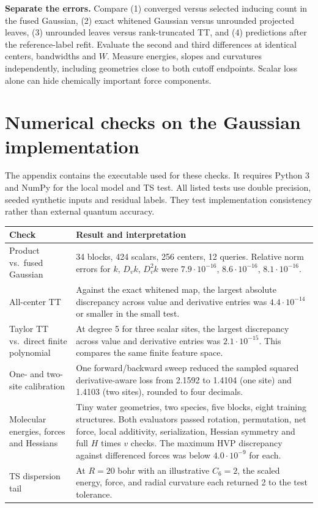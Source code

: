 \documentclass[11pt,a4paper]{article}
\begin{document}
\textbf{Separate the errors.} Compare (1) converged versus selected inducing count in the fused Gaussian, (2) exact whitened Gaussian versus unrounded projected leaves, (3) unrounded leaves versus rank-truncated TT, and (4) predictions after the reference-label refit. Evaluate the second and third differences at identical centers, bandwidths and $W$. Measure energies, slopes and curvatures independently, including geometries close to both cutoff endpoints. Scalar loss alone can hide chemically important force components.

\pg\section{Numerical checks on the Gaussian implementation}\label{sec:checked}
The appendix contains the executable used for these checks. It requires Python 3 and NumPy for the local model and TS test. All listed tests use double precision, seeded synthetic inputs and residual labels. They test implementation consistency rather than external quantum accuracy.

\begin{center}\small
\begin{tabularx}{\linewidth}{@{}p{53mm}X@{}}\toprule
Check & Result and interpretation\\\midrule
Product vs.\ fused Gaussian & 34 blocks, 424 scalars, 256 centers, 12 queries. Relative norm errors for $k$, $D_v k$, $D_v^2 k$ were $7.9\cdot10^{-16}$, $8.6\cdot10^{-16}$, $8.1\cdot10^{-16}$.\\
All-center TT & Against the exact whitened map, the largest absolute discrepancy across value and derivative entries was $4.4\cdot10^{-14}$ or smaller in the small test.\\
Taylor TT vs.\ direct finite polynomial & At degree 5 for three scalar sites, the largest discrepancy across value and derivative entries was $2.1\cdot10^{-15}$. This compares the same finite feature space.\\
One- and two-site calibration & One forward/backward sweep reduced the sampled squared derivative-aware loss from 2.1592 to 1.4104 (one site) and 1.4103 (two sites), rounded to four decimals.\\
Molecular energies, forces and Hessians & Tiny water geometries, two species, five blocks, eight training structures. Both evaluators passed rotation, permutation, net force, local additivity, serialization, Hessian symmetry and full $H$ times $v$ checks. The maximum HVP discrepancy against differenced forces was below $4.0\cdot10^{-9}$ for each.\\
TS dispersion tail & At $R=20$ bohr with an illustrative $C_6=2$, the scaled energy, force, and radial curvature each returned 2 to the test tolerance.\\\bottomrule
\end{tabularx}
\end{center}
\end{document}
